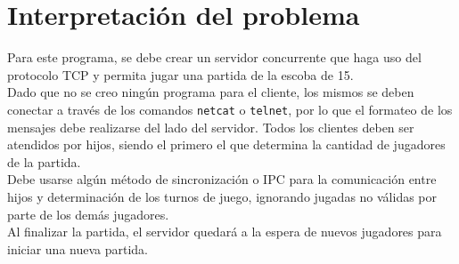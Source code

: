 \section{Interpretación del problema}
Para este programa, se debe crear un servidor concurrente que haga uso del protocolo TCP y permita jugar una partida de la escoba de 15.\\

Dado que no se creo ningún programa para el cliente, los mismos se deben conectar a través de los comandos \texttt{netcat} o \texttt{telnet}, por lo que el formateo de los mensajes debe realizarse del lado del servidor. Todos los clientes deben ser atendidos por hijos, siendo el primero el que determina la cantidad de jugadores de la partida.\\

Debe usarse algún método de sincronización o IPC para la comunicación entre hijos y determinación de los turnos de juego, ignorando jugadas no válidas por parte de los demás jugadores.\\

Al finalizar la partida, el servidor quedará a la espera de nuevos jugadores para iniciar una nueva partida.\\
